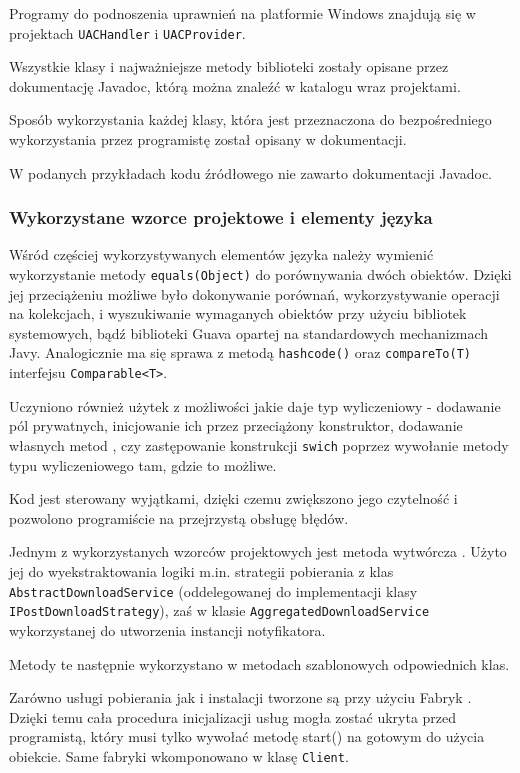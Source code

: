 \documentclass[polish,12pt,titlepage]{article}
\begin{document}
Programy do podnoszenia uprawnień na platformie Windows znajdują się
w projektach \texttt{UACHandler} i \texttt{UACProvider}.

Wszystkie klasy i najważniejsze metody biblioteki zostały opisane przez
dokumentację Javadoc, którą można znaleźć w katalogu wraz projektami.

Sposób wykorzystania każdej klasy, która jest przeznaczona do bezpośredniego
wykorzystania przez programistę został opisany w dokumentacji.

W podanych przykładach kodu źródłowego nie zawarto dokumentacji Javadoc.

\subsubsection{Wykorzystane wzorce projektowe i elementy języka}

Wśród częściej wykorzystywanych elementów języka należy wymienić wykorzystanie
metody \texttt{equals(Object)} do porównywania dwóch obiektów. Dzięki jej
przeciążeniu możliwe było dokonywanie porównań, wykorzystywanie operacji na
kolekcjach, i wyszukiwanie wymaganych obiektów przy użyciu bibliotek
systemowych, bądź biblioteki Guava opartej na standardowych mechanizmach
Javy. Analogicznie ma się sprawa z metodą \texttt{hashcode()} oraz
\texttt{compareTo(T)} interfejsu \texttt{Comparable<T>}.

Uczyniono również użytek z możliwości jakie daje typ wyliczeniowy -
dodawanie pól prywatnych, inicjowanie ich przez przeciążony konstruktor,
dodawanie własnych metod \cite{DODAWANIE_METOD_ENUM}, czy zastępowanie
konstrukcji \texttt{swich} poprzez wywołanie metody typu wyliczeniowego tam,
gdzie to możliwe.

Kod jest sterowany wyjątkami, dzięki czemu zwiększono jego czytelność i
pozwolono programiście na przejrzystą obsługę błędów.

Jednym z wykorzystanych wzorców projektowych jest metoda wytwórcza
\cite{METODA_WYTWORCZA}. Użyto jej do wyekstraktowania logiki m.in. strategii
pobierania z klas \texttt{AbstractDownloadService} (oddelegowanej do
implementacji klasy \texttt{IPostDownloadStrategy}), zaś w klasie
\texttt{AggregatedDownloadService} wykorzystanej do utworzenia instancji
notyfikatora.

Metody te następnie wykorzystano w metodach szablonowych
\cite{METODA_SZABLONOWA} odpowiednich klas.

Zarówno usługi pobierania jak i instalacji tworzone są przy użyciu Fabryk
\cite{FABRYKA_ABSTRAKCYJNA}. Dzięki temu cała procedura inicjalizacji usług
mogła zostać ukryta przed programistą, który musi tylko wywołać metodę start()
na gotowym do użycia obiekcie. Same fabryki wkomponowano \cite{KOMPOZYT} w
klasę \texttt{Client}.
\end{document}
